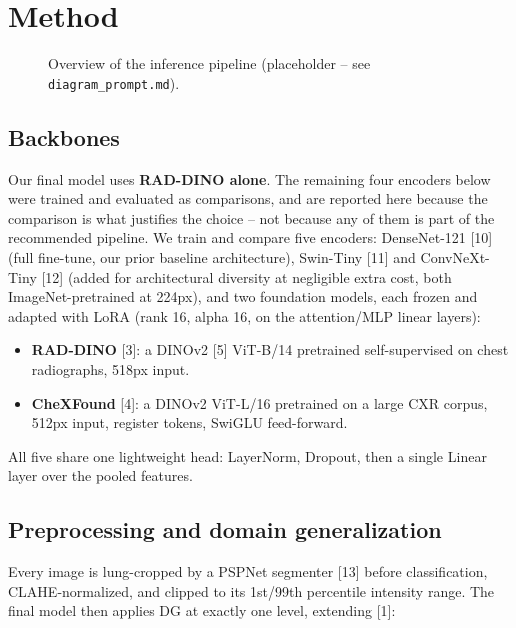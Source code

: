 \documentclass[runningheads]{llncs}
\begin{document}
\section{Method}

\begin{figure}[t]
\centering
{}
\caption{Overview of the inference pipeline (placeholder -- see
\texttt{diagram\_prompt.md}).}
\label{fig:arch}
\end{figure}

\subsection{Backbones}

Our final model uses \textbf{RAD-DINO alone}. The remaining four encoders
below were trained and evaluated as comparisons, and are reported here
because the comparison is what justifies the choice -- not because any of
them is part of the recommended pipeline. We train and compare five
encoders: DenseNet-121 [10] (full
fine-tune, our prior baseline architecture), Swin-Tiny [11] and
ConvNeXt-Tiny [12] (added for architectural diversity at
negligible extra cost, both ImageNet-pretrained at 224px), and two
foundation models, each frozen and adapted with LoRA (rank 16, alpha 16, on
the attention/MLP linear layers):

\begin{itemize}
\item \textbf{RAD-DINO} [3]: a DINOv2 [5] ViT-B/14
  pretrained self-supervised on chest radiographs, 518px input.
\item \textbf{CheXFound} [4]: a DINOv2 ViT-L/16 pretrained on a
  large CXR corpus, 512px input, register tokens, SwiGLU feed-forward.
\end{itemize}

All five share one lightweight head: LayerNorm, Dropout, then a single
Linear layer over the pooled features.

\subsection{Preprocessing and domain generalization}

Every image is lung-cropped by a PSPNet segmenter [13]
before classification, CLAHE-normalized, and clipped to its 1st/99th
percentile intensity range. The final model then applies DG at exactly one
level, extending [1]:
\end{document}
